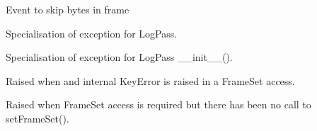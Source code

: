 \documentclass[letterpaper,10pt,english]{sphinxmanual}
\begin{document}

\begin{fulllineitems}
\label{\detokenize{ref/LIS/core/LogPass:TotalDepth.LIS.core.LogPass.EVENT_SKIP}}
Event to skip bytes in  frame

\end{fulllineitems}


\begin{fulllineitems}
\label{\detokenize{ref/LIS/core/LogPass:TotalDepth.LIS.core.LogPass.ExceptionLogPass}}
Specialisation of exception for LogPass.

\end{fulllineitems}


\begin{fulllineitems}
\label{\detokenize{ref/LIS/core/LogPass:TotalDepth.LIS.core.LogPass.ExceptionLogPassCtor}}
Specialisation of exception for LogPass \_\_init\_\_().

\end{fulllineitems}


\begin{fulllineitems}
\label{\detokenize{ref/LIS/core/LogPass:TotalDepth.LIS.core.LogPass.ExceptionLogPassKeyError}}
Raised when and internal KeyError is raised in a FrameSet access.

\end{fulllineitems}


\begin{fulllineitems}
\label{\detokenize{ref/LIS/core/LogPass:TotalDepth.LIS.core.LogPass.ExceptionLogPassNoFrameSet}}
Raised when FrameSet access is required but there has been no call to setFrameSet().

\end{fulllineitems}
\end{document}
